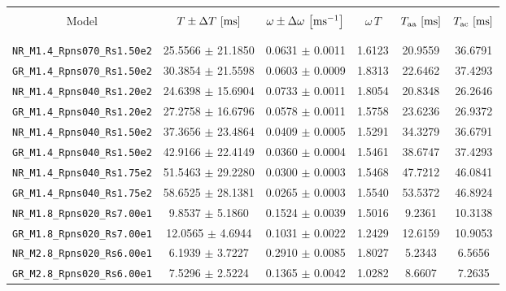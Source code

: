 \begin{table}[b]
  \scriptsize
  \renewcommand{\tabcolsep}{0.09cm}
  \centering
  \begin{tabularx}{0.7\textwidth}{cccccc} \\
    \toprule \\
    Model                                          &
    $T\pm\Delta T\,\left[\mathrm{ms}\right]$               &
    $\omega\pm\Delta\omega\,\left[\mathrm{ms}^{-1}\right]$ &
    $\omega\,T$                                    &
    $T_{\mathrm{aa}}\,\left[\mathrm{ms}\right]$                       &
    $T_{\mathrm{ac}}\,\left[\mathrm{ms}\right]$                       \\ \\
    \midrule \\
    \texttt{NR\_M1.4\_Rpns070\_Rs1.50e2} & 25.5566 $\pm$ 21.1850 & 0.0631 $\pm$ 0.0011 & 1.6123 & 20.9559 & 36.6791 \\
    \texttt{GR\_M1.4\_Rpns070\_Rs1.50e2} & 30.3854 $\pm$ 21.5598 & 0.0603 $\pm$ 0.0009 & 1.8313 & 22.6462 & 37.4293 \\
    \texttt{NR\_M1.4\_Rpns040\_Rs1.20e2} & 24.6398 $\pm$ 15.6904 & 0.0733 $\pm$ 0.0011 & 1.8054 & 20.8348 & 26.2646 \\
    \texttt{GR\_M1.4\_Rpns040\_Rs1.20e2} & 27.2758 $\pm$ 16.6796 & 0.0578 $\pm$ 0.0011 & 1.5758 & 23.6236 & 26.9372 \\
    \texttt{NR\_M1.4\_Rpns040\_Rs1.50e2} & 37.3656 $\pm$ 23.4864 & 0.0409 $\pm$ 0.0005 & 1.5291 & 34.3279 & 36.6791 \\
    \texttt{GR\_M1.4\_Rpns040\_Rs1.50e2} & 42.9166 $\pm$ 22.4149 & 0.0360 $\pm$ 0.0004 & 1.5461 & 38.6747 & 37.4293 \\
    \texttt{NR\_M1.4\_Rpns040\_Rs1.75e2} & 51.5463 $\pm$ 29.2280 & 0.0300 $\pm$ 0.0003 & 1.5468 & 47.7212 & 46.0841 \\
    \texttt{GR\_M1.4\_Rpns040\_Rs1.75e2} & 58.6525 $\pm$ 28.1381 & 0.0265 $\pm$ 0.0003 & 1.5540 & 53.5372 & 46.8924 \\
    \texttt{NR\_M1.8\_Rpns020\_Rs7.00e1} & 9.8537 $\pm$ 5.1860 & 0.1524 $\pm$ 0.0039 & 1.5016 & 9.2361 & 10.3138 \\
    \texttt{GR\_M1.8\_Rpns020\_Rs7.00e1} & 12.0565 $\pm$ 4.6944 & 0.1031 $\pm$ 0.0022 & 1.2429 & 12.6159 & 10.9053 \\
    \texttt{NR\_M2.8\_Rpns020\_Rs6.00e1} & 6.1939 $\pm$ 3.7227 & 0.2910 $\pm$ 0.0085 & 1.8027 & 5.2343 & 6.5656 \\
    \texttt{GR\_M2.8\_Rpns020\_Rs6.00e1} & 7.5296 $\pm$ 2.5224 & 0.1365 $\pm$ 0.0042 & 1.0282 & 8.6607 & 7.2635 \\

\end{tabularx}
\end{table}
